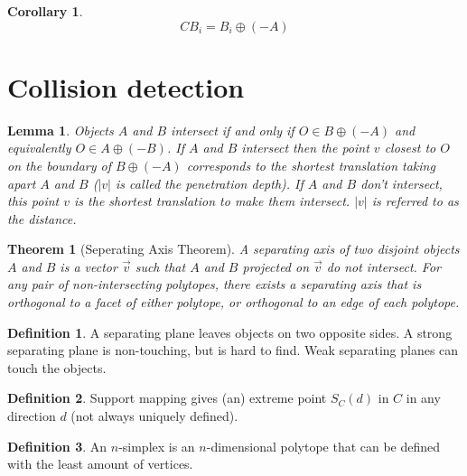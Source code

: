 \documentclass{article}
\newtheorem{theorem}{Theorem}[section]
\newtheorem{lemma}{Lemma}[section]
\newtheorem{corollary}{Corollary}[section]
\theoremstyle{definition}
\newtheorem{definition}{Definition}[section]
\begin{document}
\begin{corollary}
\[ CB_i = B_i \oplus (-A) \]
\end{corollary}

\section{Collision detection}

\begin{lemma}
Objects $A$ and $B$ intersect if and only if $O \in B \oplus (-A)$ and equivalently $O \in A \oplus (-B)$.\newline
If $A$ and $B$ intersect then the point $v$ closest to $O$ on the boundary of $B \oplus (-A)$ corresponds to the shortest translation taking apart $A$ and $B$ ($|v|$ is called the \emph{penetration depth}).\newline
If $A$ and $B$ don't intersect, this point $v$ is the shortest translation to make them intersect. $|v|$ is referred to as the \emph{distance}.
\end{lemma}

\begin{theorem}[Seperating Axis Theorem]
A separating axis of two disjoint objects $A$ and $B$ is a vector $\vec{v}$ such that $A$ and $B$ projected on $\vec{v}$ do not intersect. For any pair of non-intersecting polytopes, there exists a separating axis that is orthogonal to a facet of either polytope, or orthogonal to an edge of each polytope.
\end{theorem}

\begin{definition}
A separating plane leaves objects on two opposite sides. A strong separating plane is non-touching, but is hard to find. Weak separating planes can touch the objects.
\end{definition}

\begin{definition}
Support mapping gives (an) extreme point $S_C(d)$ in $C$ in any direction $d$ (not always uniquely defined).
\end{definition}

\begin{definition}
An $n$-simplex is an $n$-dimensional polytope that can be defined with the least amount of vertices.
\end{definition}
\end{document}
